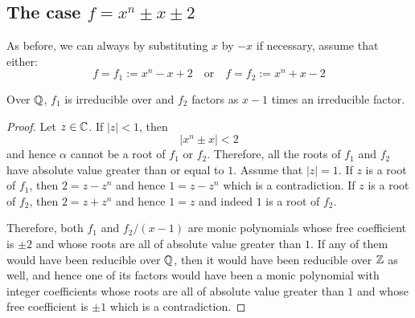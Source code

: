 \documentclass[../main.tex]{subfiles}
\begin{document}
\subsection{The case $f = x^n \pm x \pm 2$}
As before, we can always by substituting $x$ by $-x$ if necessary, assume that either:
\[
  f = f_1 := x^n - x + 2 \quad \text{or} \quad f = f_2 := x^n + x - 2
\]
\begin{lemma}
  Over $\mathbb{Q}$, $f_1$ is irreducible over and $f_2$ factors as $x - 1$ times an irreducible factor.
\end{lemma}
\begin{proof}
  Let $z \in \mathbb{C}$.
  If $\left| z \right| < 1$, then 
  \[
    \left| x^n \pm x \right| < 2
  \]
  and hence $\alpha$ cannot be a root of $f_1$ or $f_2$.
  Therefore, all the roots of $f_1$ and $f_2$ have absolute value greater than or equal to $1$.
  Assume that $\left| z \right| = 1$.
  If $z$ is a root of $f_1$, then $2 = z - z^n$ and hence $1 = z - z^n$ which is a contradiction.
  If $z$ is a root of $f_2$, then $2 = z + z^n$ and hence $1 = z$ and indeed $1$ is a root of $f_2$.

  Therefore, both $f_1$ and $f_2 / \left( x - 1 \right)$ are monic polynomials whose free coefficient is $\pm 2$ and whose roots are all of absolute value greater than $1$.
  If any of them would have been reducible over $\mathbb{Q}$, then it would have been reducible over $\mathbb{Z}$ as well, and hence one of its factors would have been a monic polynomial with integer coefficients whose roots are all of absolute value greater than $1$ and whose free coefficient is $\pm 1$ which is a contradiction.
\end{proof}
\end{document}
